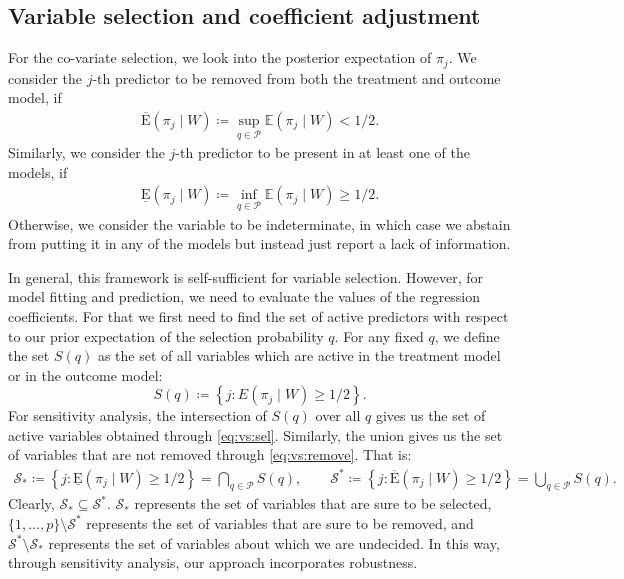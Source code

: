 \documentclass{amsart}
\newcommand{\lexp}{\underline{\text{E}}}
\newcommand{\uexp}{\overline{\text{E}}}
\begin{document}
\subsection{Variable selection and coefficient adjustment}
For the co-variate selection, we look into the posterior expectation of $\pi_j$. 
We consider the $j$-th predictor to be removed from both the
treatment and outcome model, if
\begin{align}\label{eq:vs:remove}
	\uexp (\pi_j\mid W)\coloneqq \sup_{q\in \mathcal{P}} \mathbb{E}(\pi_j\mid W) < 1/2.
\end{align}
Similarly, we consider the $j$-th predictor to be present in at least one of the models, if
\begin{align}\label{eq:vs:sel}
	\lexp (\pi_j\mid W)\coloneqq \inf_{q\in \mathcal{P}} \mathbb{E}(\pi_j\mid W) \ge 1/2.
\end{align}
Otherwise, we consider the variable to be indeterminate,  in which case we abstain from putting
it in any of the models but instead just report a lack of information.

In general, this framework is
self-sufficient
for variable selection. However, for
model fitting and prediction, we need to evaluate the values 
of the regression coefficients. For that we first need to find the set of active
predictors with respect to our prior expectation of the selection probability $q$.
For any fixed $q$, we define the set $S(q)$ as the set of all variables which are active
in the treatment model or in the outcome model:
\begin{equation}
	S(q)\coloneqq
	\left\{j\colon E(\pi_j\mid W) \ge 1/2\right\}.
\end{equation}
For sensitivity analysis,
the intersection of $S(q)$ over all $q$ gives us the set of
active variables obtained through \cref{eq:vs:sel}.
Similarly, the union gives us the set of
variables that are not removed through \cref{eq:vs:remove}.
That is:
\begin{align}
    \mathcal{S}_*\coloneqq \left\{j:\lexp (\pi_j\mid W)\ge1/2\right\}
    = \bigcap_{q\in \mathcal{P}}S(q),
    \qquad \mathcal{S}^*\coloneqq \left\{j:\uexp (\pi_j\mid W)\ge1/2\right\}
    = \bigcup_{q\in \mathcal{P}}S(q).
\end{align}
Clearly, $\mathcal{S}_*\subseteq\mathcal{S}^*$.
$\mathcal{S}_*$ represents the set of variables that are sure to be selected,
$\{1,\dots,p\}\setminus\mathcal{S}^*$ represents the set of variables that are sure to be removed, and
$\mathcal{S}^*\setminus\mathcal{S}_*$ represents the set of variables about which we are undecided.
In this way, through sensitivity analysis, our approach incorporates robustness.
\end{document}
